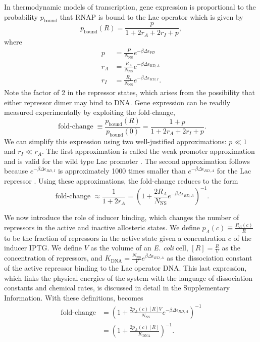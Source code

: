 \documentclass[10pt,letterpaper]{article}
\newcommand{\K}{K_{\text{DNA}}}
\newcommand \foldchange{\operatorname{fold-change}}
\begin{document}
In thermodynamic models of transcription, gene expression is proportional to the
probability $p_{\text{bound}}$ that RNAP is bound to the Lac operator which is
given by
\begin{equation}\label{eq2}
p_{\text{bound}}(R)=\frac{p}{1+2r_A+2r_I+p},
\end{equation}
where
\begin{align}
p &= \frac{P}{N_{\text{NS}}}e^{-\beta  \Delta\epsilon _{PD}} \\
r_A &= \frac{R_A}{N_{\text{NS}}}e^{-\beta \Delta\epsilon _{RD,A}} \\
r_I &= \frac{R_I}{N_{\text{NS}}}e^{-\beta  \Delta\epsilon _{RD,I}}.
\end{align}
Note the factor of 2 in the repressor states, which arises from the possibility
that either repressor dimer may bind to DNA. Gene expression can be readily
measured experimentally by exploiting the fold-change,
\begin{equation}\label{eq3}
\foldchange\equiv \frac{p_{\text{bound}}(R)}{p_{\text{bound}}(0)}=\frac{1+p}{1+2r_A+2r_I+p}.
\end{equation}
We can simplify this expression using two well-justified approximations: \(p\ll
1\) and \(r_I\ll r_A\). The first approximation is called the weak promoter
approximation and is valid for the wild type Lac promoter \cite{Brewster2012}.
The second approximation follows because $e^{-\beta  \Delta\epsilon _{RD,I}}$ is
approximately 1000 times smaller than $e^{-\beta \Delta\epsilon _{RD,A}}$ for
the Lac repressor \cite{Daber2011a}. Using these approximations, the fold-change
reduces to the form
\begin{equation}\label{eq4}
\foldchange\approx \frac{1}{1+2r_A}=\left(1+\frac{2R_A}{N_{\text{NS}}}e^{-\beta  \Delta\epsilon _{RD,A}}\right)^{-1}.
\end{equation}

We now introduce the role of inducer binding, which changes the number of
repressors in the active and inactive allosteric states. We define \(p_A(c)
\equiv \frac{R_A(c)}{R}\) to be the fraction of repressors in the active state
given a concentration \(c\) of the inducer IPTG. We define \(V\) as the volume
of an \textit{E. coli} cell, \([R]=\frac{R}{V}\) as the concentration of
repressors, and \(\K=\frac{N_{\text{NS}}}{V}e^{\beta \Delta\epsilon _{RD,A}}\)
as the dissociation constant of the active repressor binding to the Lac operator
DNA. This last expression, which links the physical energies of the system with
the language of dissociation constants and chemical rates, is discussed in
detail in the Supplementary Information. With these definitions, \eref[eq4]
becomes
\begin{align}
\foldchange &= \left( 1+\frac{2p_A(c) [R] V}{N_{\text{NS}}}e^{-\beta  \Delta\epsilon
	_{RD,A}} \right)^{-1} \nonumber \\
&= \left( 1+\frac{2p_A(c) [R]}{\K} \right)^{-1}. \label{eq5}
\end{align}
\end{document}
